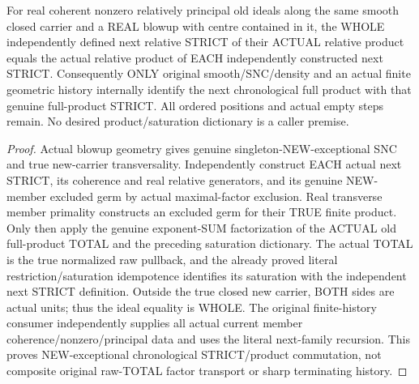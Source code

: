 \begin{theorem}
\label{hir:sharp-actual-next-full-product-relative-strict-commutation}
\leanok
For real coherent nonzero relatively principal old ideals along the same
smooth closed carrier and a REAL blowup with centre contained in it, the
WHOLE independently defined next relative STRICT of their ACTUAL relative
product equals the actual relative product of EACH independently constructed
next STRICT. Consequently ONLY original smooth/SNC/density and an actual
finite geometric history internally identify the next chronological full
product with that genuine full-product STRICT. All ordered positions and
actual empty steps remain. No desired product/saturation dictionary is a
caller premise.
\end{theorem}
\begin{proof}
Actual blowup geometry gives genuine singleton-NEW-exceptional SNC and true
new-carrier transversality. Independently construct EACH actual next STRICT,
its coherence and real relative generators, and its genuine NEW-member
excluded germ by actual maximal-factor exclusion. Real transverse member
primality constructs an excluded germ for their TRUE finite product.
Only then apply the genuine exponent-SUM factorization of the ACTUAL old
full-product TOTAL and the preceding saturation dictionary. The actual
TOTAL is the true normalized raw pullback, and the already proved literal
restriction/saturation idempotence identifies its saturation with the
independent next STRICT definition. Outside the true closed new carrier,
BOTH sides are actual units; thus the ideal equality is WHOLE. The original
finite-history consumer independently supplies all actual current member
coherence/nonzero/principal data and uses the literal next-family recursion.
This proves NEW-exceptional chronological STRICT/product commutation, not
composite original raw-TOTAL factor transport or sharp terminating history.
\end{proof}
